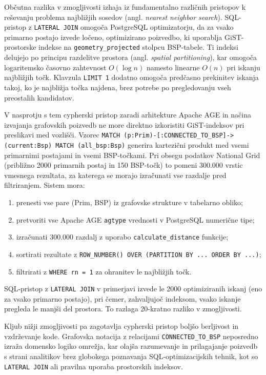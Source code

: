 \documentclass[a4paper,12pt,openright]{book}
\begin{document}
Občutna razlika v zmogljivosti izhaja iz fundamentalno različnih pristopov k reševanju problema najbližjih sosedov (angl. \textit{nearest neighbor search}). SQL-pristop z \texttt{LATERAL JOIN} omogoča PostgreSQL optimizatorju, da za vsako primarno postajo izvede ločeno, optimizirano poizvedbo, ki uporablja GiST-prostorske indekse na \texttt{geometry\_projected} stolpcu BSP-tabele. Ti indeksi delujejo po principu razdelitve prostora (angl. \textit{spatial partitioning}), kar omogoča logaritemsko časovno zahtevnost $O(\log n)$ namesto linearne $O(n)$ pri iskanju najbližjih točk. Klavzula \texttt{LIMIT 1} dodatno omogoča predčasno prekinitev iskanja takoj, ko je najbližja točka najdena, brez potrebe po pregledovanju vseh preostalih kandidatov.

V nasprotju s tem cypherski pristop zaradi arhitekture Apache AGE in načina izvajanja grafovskih poizvedb ne more direktno izkoristiti GiST-indeksov pri preslikavi med vozlišči. Vzorec \texttt{MATCH (p:Prim)-[:CONNECTED\_TO\_BSP]->(current:Bsp) MATCH (all\_bsp:Bsp)} generira kartezični produkt med vsemi primarnimi postajami in vsemi BSP-točkami. Pri obsegu podatkov National Grid (približno 2000 primarnih postaj in 150 BSP-točk) to pomeni 300.000 vrstic vmesnega rezultata, za katerega se morajo izračunati vse razdalje pred filtriranjem. Sistem mora:

\begin{enumerate}
\item prenesti vse pare (Prim, BSP) iz grafovske strukture v tabelarno obliko;
\item pretvoriti vse Apache AGE \texttt{agtype} vrednosti v PostgreSQL numerične tipe;
\item izračunati 300.000 razdalj z uporabo \texttt{calculate\_distance} funkcije;
\item sortirati rezultate z \texttt{ROW\_NUMBER() OVER (PARTITION BY ... ORDER BY ...)};
\item filtrirati z \texttt{WHERE rn = 1} za ohranitev le najbližjih točk.
\end{enumerate}

SQL-pristop z \texttt{LATERAL JOIN} v primerjavi izvede le 2000 optimiziranih iskanj (eno za vsako primarno postajo), pri čemer, zahvaljujoč indeksom, vsako iskanje pregleda le manjši del prostora. To razlaga 20-kratno razliko v zmogljivosti.

Kljub nižji zmogljivosti pa zagotavlja cypherski pristop boljšo berljivost in vzdrževanje kode. Grafovska notacija z relacijami \texttt{CONNECTED\_TO\_BSP} neposredno izraža domensko logiko omrežja, kar olajša razumevanje in prilagajanje poizvedb s strani analitikov brez globokega poznavanja SQL-optimizacijskih tehnik, kot so \texttt{LATERAL JOIN} ali pravilna uporaba prostorskih indeksov.
\end{document}
